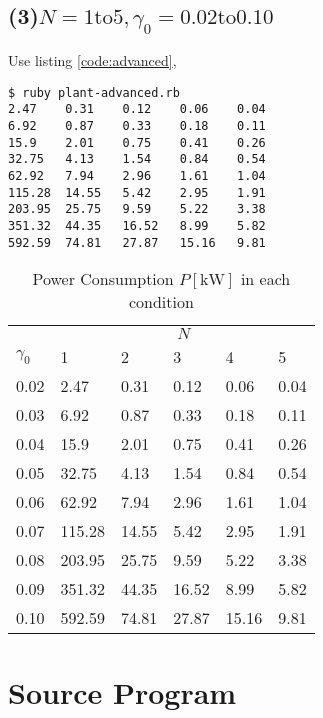 \documentclass[a4paper,titlepage]{article}
\begin{document}
  \newpage

  \subsection*{(3)$N=1 \mathrm{to} 5, \gamma_0 = 0.02 \mathrm{to} 0.10$}
  Use listing \ref{code:advanced},

  \begin{screen}
    \begin{verbatim}
$ ruby plant-advanced.rb
2.47	0.31	0.12	0.06	0.04
6.92	0.87	0.33	0.18	0.11
15.9	2.01	0.75	0.41	0.26
32.75	4.13	1.54	0.84	0.54
62.92	7.94	2.96	1.61	1.04
115.28	14.55	5.42	2.95	1.91
203.95	25.75	9.59	5.22	3.38
351.32	44.35	16.52	8.99	5.82
592.59	74.81	27.87	15.16	9.81\end{verbatim}
  \end{screen}

  \begin{table}[htbp]
    \centering
    \begin{tabular}{l|lllll}\hline
      & \multicolumn{5}{c}{$N$} \\
      $\gamma_0$ & 1 & 2 & 3 & 4 & 5 \\ \hline
      0.02 & 2.47 & 0.31 & 0.12 & 0.06 & 0.04 \\
      0.03 & 6.92 & 0.87 & 0.33 & 0.18 & 0.11 \\
      0.04 & 15.9 & 2.01 & 0.75 & 0.41 & 0.26 \\
      0.05 & 32.75 & 4.13 & 1.54 & 0.84 & 0.54 \\
      0.06 & 62.92 & 7.94 & 2.96 & 1.61 & 1.04 \\
      0.07 & 115.28 & 14.55 & 5.42 & 2.95 & 1.91 \\
      0.08 & 203.95 & 25.75 & 9.59 & 5.22 & 3.38 \\
      0.09 & 351.32 & 44.35 & 16.52 & 8.99 & 5.82 \\
      0.10 & 592.59 & 74.81 & 27.87 & 15.16 & 9.81 \\ \hline
    \end{tabular}
    \caption{Power Consumption $P [\si{\kilo\watt}]$ in each condition}
  \end{table}

  \newpage

  \section{Source Program}
  

  \newpage

  
\end{document}
